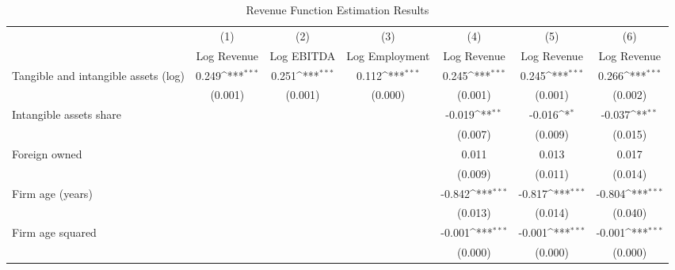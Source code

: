 \begin{table}[htbp]\centering
\def\sym#1{\ifmmode^{#1}\else\(^{#1}\)\fi}
\caption{Revenue Function Estimation Results}
\begin{tabular}{l*{6}{c}}
\toprule
                    &\multicolumn{1}{c}{(1)}&\multicolumn{1}{c}{(2)}&\multicolumn{1}{c}{(3)}&\multicolumn{1}{c}{(4)}&\multicolumn{1}{c}{(5)}&\multicolumn{1}{c}{(6)}\\
                    &\multicolumn{1}{c}{Log Revenue}&\multicolumn{1}{c}{Log EBITDA}&\multicolumn{1}{c}{Log Employment}&\multicolumn{1}{c}{Log Revenue}&\multicolumn{1}{c}{Log Revenue}&\multicolumn{1}{c}{Log Revenue}\\
\midrule
Tangible and intangible assets (log)&       0.249\sym{***}&       0.251\sym{***}&       0.112\sym{***}&       0.245\sym{***}&       0.245\sym{***}&       0.266\sym{***}\\
                    &     (0.001)         &     (0.001)         &     (0.000)         &     (0.001)         &     (0.001)         &     (0.002)         \\
\addlinespace
Intangible assets share&                     &                     &                     &      -0.019\sym{**} &      -0.016\sym{*}  &      -0.037\sym{**} \\
                    &                     &                     &                     &     (0.007)         &     (0.009)         &     (0.015)         \\
\addlinespace
Foreign owned       &                     &                     &                     &       0.011         &       0.013         &       0.017         \\
                    &                     &                     &                     &     (0.009)         &     (0.011)         &     (0.014)         \\
\addlinespace
Firm age (years)    &                     &                     &                     &      -0.842\sym{***}&      -0.817\sym{***}&      -0.804\sym{***}\\
                    &                     &                     &                     &     (0.013)         &     (0.014)         &     (0.040)         \\
\addlinespace
Firm age squared    &                     &                     &                     &      -0.001\sym{***}&      -0.001\sym{***}&      -0.001\sym{***}\\
                    &                     &                     &                     &     (0.000)         &     (0.000)         &     (0.000)         \\

\end{tabular}
\end{table}
